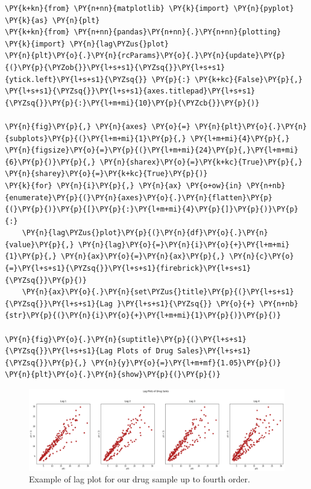 \begin{codebox}[breakable, size=fbox, boxrule=1pt, pad at break*=1mm,colback=cellbackground, colframe=cellborder]
\begin{Verbatim}[commandchars=\\\{\}]
\PY{k+kn}{from} \PY{n+nn}{matplotlib} \PY{k}{import} \PY{n}{pyplot} \PY{k}{as} \PY{n}{plt}
\PY{k+kn}{from} \PY{n+nn}{pandas}\PY{n+nn}{.}\PY{n+nn}{plotting} \PY{k}{import} \PY{n}{lag\PYZus{}plot}
\PY{n}{plt}\PY{o}{.}\PY{n}{rcParams}\PY{o}{.}\PY{n}{update}\PY{p}{(}\PY{p}{\PYZob{}}\PY{l+s+s1}{\PYZsq{}}\PY{l+s+s1}{ytick.left}\PY{l+s+s1}{\PYZsq{}} \PY{p}{:} \PY{k+kc}{False}\PY{p}{,} \PY{l+s+s1}{\PYZsq{}}\PY{l+s+s1}{axes.titlepad}\PY{l+s+s1}{\PYZsq{}}\PY{p}{:}\PY{l+m+mi}{10}\PY{p}{\PYZcb{}}\PY{p}{)}

\PY{n}{fig}\PY{p}{,} \PY{n}{axes} \PY{o}{=} \PY{n}{plt}\PY{o}{.}\PY{n}{subplots}\PY{p}{(}\PY{l+m+mi}{1}\PY{p}{,} \PY{l+m+mi}{4}\PY{p}{,} \PY{n}{figsize}\PY{o}{=}\PY{p}{(}\PY{l+m+mi}{24}\PY{p}{,}\PY{l+m+mi}{6}\PY{p}{)}\PY{p}{,} \PY{n}{sharex}\PY{o}{=}\PY{k+kc}{True}\PY{p}{,} \PY{n}{sharey}\PY{o}{=}\PY{k+kc}{True}\PY{p}{)}
\PY{k}{for} \PY{n}{i}\PY{p}{,} \PY{n}{ax} \PY{o+ow}{in} \PY{n+nb}{enumerate}\PY{p}{(}\PY{n}{axes}\PY{o}{.}\PY{n}{flatten}\PY{p}{(}\PY{p}{)}\PY{p}{[}\PY{p}{:}\PY{l+m+mi}{4}\PY{p}{]}\PY{p}{)}\PY{p}{:}
    \PY{n}{lag\PYZus{}plot}\PY{p}{(}\PY{n}{df}\PY{o}{.}\PY{n}{value}\PY{p}{,} \PY{n}{lag}\PY{o}{=}\PY{n}{i}\PY{o}{+}\PY{l+m+mi}{1}\PY{p}{,} \PY{n}{ax}\PY{o}{=}\PY{n}{ax}\PY{p}{,} \PY{n}{c}\PY{o}{=}\PY{l+s+s1}{\PYZsq{}}\PY{l+s+s1}{firebrick}\PY{l+s+s1}{\PYZsq{}}\PY{p}{)}
    \PY{n}{ax}\PY{o}{.}\PY{n}{set\PYZus{}title}\PY{p}{(}\PY{l+s+s1}{\PYZsq{}}\PY{l+s+s1}{Lag }\PY{l+s+s1}{\PYZsq{}} \PY{o}{+} \PY{n+nb}{str}\PY{p}{(}\PY{n}{i}\PY{o}{+}\PY{l+m+mi}{1}\PY{p}{)}\PY{p}{)}

\PY{n}{fig}\PY{o}{.}\PY{n}{suptitle}\PY{p}{(}\PY{l+s+s1}{\PYZsq{}}\PY{l+s+s1}{Lag Plots of Drug Sales}\PY{l+s+s1}{\PYZsq{}}\PY{p}{,} \PY{n}{y}\PY{o}{=}\PY{l+m+mf}{1.05}\PY{p}{)}    
\PY{n}{plt}\PY{o}{.}\PY{n}{show}\PY{p}{(}\PY{p}{)}
\end{Verbatim}
\end{codebox}

\begin{figure}[htb]
	\centering
	\includegraphics[width=\linewidth]{figures/lag_plot.png}
	\caption{Example of lag plot for our drug sample up to fourth order.}
	\label{fig:lag_plot}
\end{figure}
    
